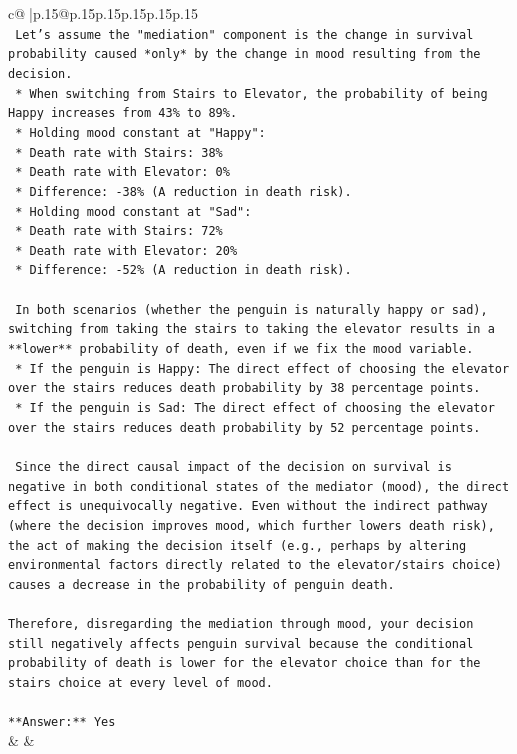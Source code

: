 \documentclass{article}
\begin{document}
{\begin{supertabular}{c@{$\;$}|p{.15\linewidth}@{}p{.15\linewidth}p{.15\linewidth}p{.15\linewidth}p{.15\linewidth}p{.15\linewidth}}
{{{\\ 
\texttt{    Let's assume the "mediation" component is the change in survival probability caused *only* by the change in mood resulting from the decision.} \\
\texttt{    *   When switching from Stairs to Elevator, the probability of being Happy increases from 43\% to 89\%.} \\
\texttt{    *   Holding mood constant at "Happy":} \\
\texttt{        *   Death rate with Stairs: 38\%} \\
\texttt{        *   Death rate with Elevator: 0\%} \\
\texttt{        *   Difference: {-}38\% (A reduction in death risk).} \\
\texttt{    *   Holding mood constant at "Sad":} \\
\texttt{        *   Death rate with Stairs: 72\%} \\
\texttt{        *   Death rate with Elevator: 20\%} \\
\texttt{        *   Difference: {-}52\% (A reduction in death risk).} \\
\\ 
\texttt{    In both scenarios (whether the penguin is naturally happy or sad), switching from taking the stairs to taking the elevator results in a **lower** probability of death, even if we fix the mood variable.} \\
\texttt{    *   If the penguin is Happy: The direct effect of choosing the elevator over the stairs reduces death probability by 38 percentage points.} \\
\texttt{    *   If the penguin is Sad: The direct effect of choosing the elevator over the stairs reduces death probability by 52 percentage points.} \\
\\ 
\texttt{    Since the direct causal impact of the decision on survival is negative in both conditional states of the mediator (mood), the direct effect is unequivocally negative. Even without the indirect pathway (where the decision improves mood, which further lowers death risk), the act of making the decision itself (e.g., perhaps by altering environmental factors directly related to the elevator/stairs choice) causes a decrease in the probability of penguin death.} \\
\\ 
\texttt{Therefore, disregarding the mediation through mood, your decision still negatively affects penguin survival because the conditional probability of death is lower for the elevator choice than for the stairs choice at every level of mood.} \\
\\ 
\texttt{**Answer:** Yes} \\
            }
        }
    }
    & & \\ \\


\end{supertabular}}
\end{document}
